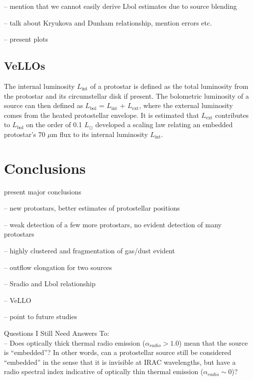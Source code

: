 \documentclass[apj]{emulateapj}
\begin{document}
-- mention that we cannot easily derive Lbol estimates due to source blending

-- talk about Kryukova and Dunham relationship, mention errors etc.

-- present plots

\subsection{VeLLOs}
\label{sec:vellos}
The internal luminosity $L_{\text{int}}$ of a protostar is defined as the total luminosity from the protostar and its circumstellar disk if present. The bolometric luminosity of a source can then defined as $L_{\text{bol}}$ = $L_{\text{int}}$ + $L_{\text{ext}}$, where the external luminosity comes from the heated protostellar envelope. It is estimated that $L_{\text{ext}}$ contributes to $L_{\text{bol}}$ on the order of 0.1 $L_{\odot}$ \citet{Dunham08} developed a scaling law relating an embedded protostar's 70 $\mu$m flux to its internal luminosity $L_{\text{int}}$.



\section{Conclusions}
\label{sec:conclusions}

present major conclusions

-- new protostars, better estimates of protostellar positions

-- weak detection of a few more protostars, no evident detection of many protostars

-- highly clustered and fragmentation of gas/dust evident

-- outflow elongation for two sources

-- Sradio and Lbol relationship

-- VeLLO

-- point to future studies

		
{}



\appendix
 
{\large Questions I Still Need Answers To:} \\[.1in]


-- Does optically thick thermal radio emission ($\alpha_{radio} > 1.0$) mean that the source is ``embedded''? In other words, can a protostellar source still be considered ``embedded'' in the sense that it is invisible at IRAC wavelengths, but have a radio spectral index indicative of optically thin thermal emission ($\alpha_{radio} \sim0$)?\\
\end{document}
